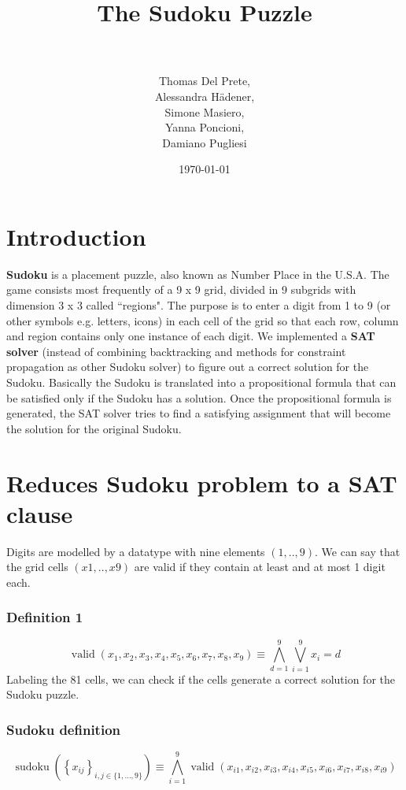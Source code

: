 \documentclass[paper=a4, fontsize=14pt]{scrartcl} %
\title{
\huge The Sudoku Puzzle \\ %
\horrule{0.5pt} \\[0.5cm] %
}
\author{Thomas Del Prete, \\
		Alessandra H{\" a}dener, \\
		Simone Masiero, \\
		Yanna Poncioni, \\
		Damiano Pugliesi} %
\date{\normalsize\today} %
\begin{document}
	\maketitle

	\section*{Introduction}

		\textbf{Sudoku} is a placement puzzle, also known as Number Place in the U.S.A.
		\newline
		The game consists most frequently of a 9 x 9 grid, divided in 9 subgrids with dimension 3 x 3 called ``regions".
		\newline
		The purpose is to enter a digit from 1 to 9 (or other symbols e.g. letters, icons) in each cell of the grid so that each row, column and region contains only one instance of each digit.
		\newline
		We implemented a \textbf{SAT solver} (instead of combining backtracking and methods for constraint propagation as other Sudoku solver) to figure out a correct solution for the Sudoku.
		\newline
		Basically the Sudoku is translated into a propositional formula that can be satisfied only if the Sudoku has a solution.
		\newline
		Once the propositional formula is generated, the SAT solver tries to find a satisfying assignment that will become the solution for the original Sudoku.

	\section*{Reduces Sudoku problem to a SAT clause}


	Digits are modelled by a datatype with nine elements $(1, . . , 9)$.
	\newline
	We can say that the grid cells $(x1, . . , x9)$ are valid if they contain
	at least and at most 1 digit each.
	\subsubsection*{Definition 1}
		\[ \operatorname{valid}\left(x_{1}, x_{2}, x_{3}, x_{4}, x_{5}, x_{6}, x_{7}, x_{8}, x_{9}\right) \equiv \bigwedge_{d=1}^{9} \bigvee_{i=1}^{9} x_{i}=d \]
	Labeling the 81 cells, we can check if the cells generate a correct solution for the Sudoku puzzle.

	\subsubsection*{Sudoku definition}
	\[\operatorname{sudoku}\left(\left\{x_{i j}\right\}_{i, j \in\{1, \ldots, 9\}}\right) \equiv \bigwedge_{i=1}^{9} \operatorname{valid}\left(x_{i 1}, x_{i 2}, x_{i 3}, x_{i 4}, x_{i 5}, x_{i 6}, x_{i 7}, x_{i 8}, x_{i 9}\right)\]
\end{document}
